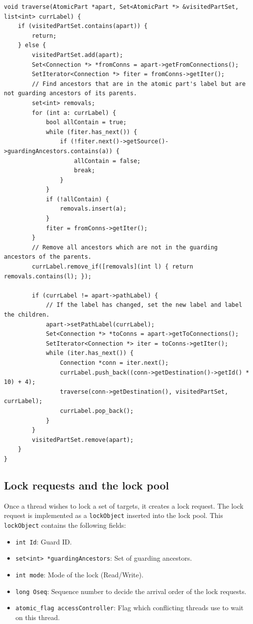 \begin{lstlisting}[caption={Labelling an atomic part.},label={lst:traverseAP}]
void traverse(AtomicPart *apart, Set<AtomicPart *> &visitedPartSet, list<int> currLabel) {
    if (visitedPartSet.contains(apart)) {
        return;
    } else {
        visitedPartSet.add(apart);
        Set<Connection *> *fromConns = apart->getFromConnections();
        SetIterator<Connection *> fiter = fromConns->getIter();
        // Find ancestors that are in the atomic part's label but are not guarding ancestors of its parents.
        set<int> removals;
        for (int a: currLabel) {
            bool allContain = true;
            while (fiter.has_next()) {
                if (!fiter.next()->getSource()->guardingAncestors.contains(a)) {
                    allContain = false;
                    break;
                }
            }
            if (!allContain) {
                removals.insert(a);
            }
            fiter = fromConns->getIter();
        }
        // Remove all ancestors which are not in the guarding ancestors of the parents.
        currLabel.remove_if([removals](int l) { return removals.contains(l); });

        if (currLabel != apart->pathLabel) {
            // If the label has changed, set the new label and label the children.
            apart->setPathLabel(currLabel);
            Set<Connection *> *toConns = apart->getToConnections();
            SetIterator<Connection *> iter = toConns->getIter();
            while (iter.has_next()) {
                Connection *conn = iter.next();
                currLabel.push_back((conn->getDestination()->getId() * 10) + 4);
                traverse(conn->getDestination(), visitedPartSet, currLabel);
                currLabel.pop_back();
            }
        }
        visitedPartSet.remove(apart);
    }
}
\end{lstlisting}




\subsection{Lock requests and the lock pool}

Once a thread wishes to lock a set of targets, it creates a lock request. The lock request is implemented as a \texttt{lockObject} inserted into the lock pool. This \texttt{lockObject} contains the following fields:

\begin{itemize}
    \item \texttt{int Id}: Guard ID.
    \item \texttt{set<int> *guardingAncestors}: Set of guarding ancestors.
    \item \texttt{int mode}: Mode of the lock (Read/Write).
    \item \texttt{long Oseq}: Sequence number to decide the arrival order of the lock requests.
    \item \texttt{atomic\_flag accessController}: Flag which conflicting threads use to wait on this thread.
\end{itemize}

